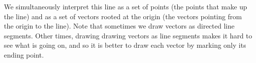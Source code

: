 \begin{center}
\end{center}
We simultaneously interpret this line as a set of points (the points that make up
the line) and as a set of vectors 
rooted at the origin (the vectors pointing from the origin to the line).
Note that sometimes we draw vectors as directed line segments.
Other times, drawing drawing vectors as line segments makes
it hard to see what is going on, and so it is better to draw
each vector by marking only its ending point.

